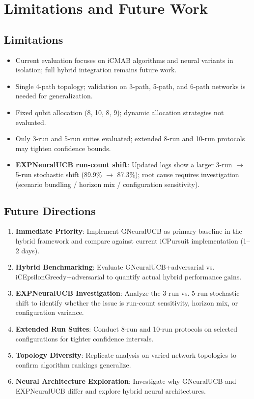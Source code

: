 \documentclass[12pt,a4paper]{article}
\newcommand{\legacy}[1]{\textcolor{legacycolor}{\textbf{#1}}}
\begin{document}
\section{Limitations and Future Work}

\subsection{Limitations}
\begin{itemize}
\item Current evaluation focuses on iCMAB algorithms and neural variants in isolation; full hybrid integration remains future work.
\item Single 4-path topology; validation on 3-path, 5-path, and 6-path networks is needed for generalization.
\item Fixed qubit allocation (8, 10, 8, 9); dynamic allocation strategies not evaluated.
\item Only 3-run and 5-run suites evaluated; extended 8-run and 10-run protocols may tighten confidence bounds.
\item \legacy{EXPNeuralUCB run-count shift}: Updated logs show a larger 3-run $\rightarrow$ 5-run stochastic shift (89.9\% $\rightarrow$ 87.3\%); root cause requires investigation (scenario bundling / horizon mix / configuration sensitivity).
\end{itemize}

\subsection{Future Directions}
\begin{enumerate}
\item \textbf{Immediate Priority}: Implement GNeuralUCB as primary baseline in the hybrid framework and compare against current iCPursuit implementation (1--2 days).
\item \textbf{Hybrid Benchmarking}: Evaluate GNeuralUCB+adversarial vs. iCEpsilonGreedy+adversarial to quantify actual hybrid performance gains.
\item \textbf{EXPNeuralUCB Investigation}: Analyze the 3-run vs. 5-run stochastic shift to identify whether the issue is run-count sensitivity, horizon mix, or configuration variance.
\item \textbf{Extended Run Suites}: Conduct 8-run and 10-run protocols on selected configurations for tighter confidence intervals.
\item \textbf{Topology Diversity}: Replicate analysis on varied network topologies to confirm algorithm rankings generalize.
\item \textbf{Neural Architecture Exploration}: Investigate why GNeuralUCB and EXPNeuralUCB differ and explore hybrid neural architectures.
\end{enumerate}
\end{document}
